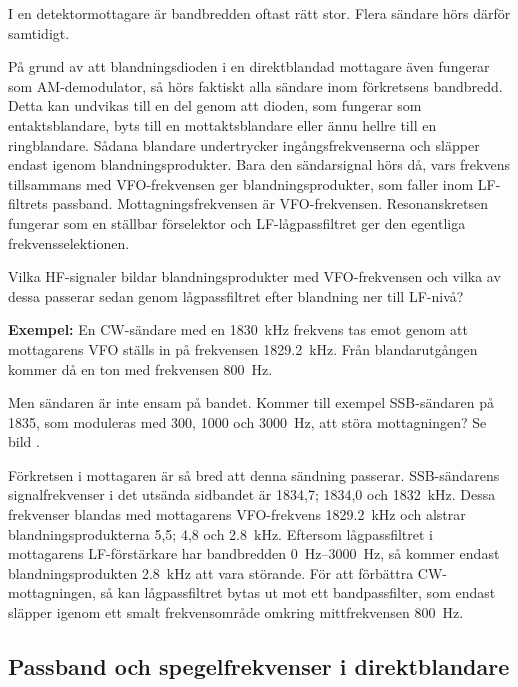 I en detektormottagare är bandbredden oftast rätt stor.
Flera sändare hörs därför samtidigt.

På grund av att blandningsdioden i en direktblandad mottagare även fungerar
som AM-demodulator, så hörs faktiskt alla sändare inom förkretsens bandbredd.
Detta kan undvikas till en del genom att dioden, som fungerar som
entaktsblandare, byts till en mottaktsblandare eller ännu hellre till en
ringblandare.
Sådana blandare undertrycker ingångsfrekvenserna och släpper endast igenom
blandningsprodukter.
Bara den sändarsignal hörs då, vars frekvens tillsammans med VFO-frekvensen
ger blandningsprodukter, som faller inom LF-filtrets passband.
Mottagningsfrekvensen är VFO-frekvensen.
Resonanskretsen fungerar som en ställbar förselektor och LF-lågpassfiltret
ger den egentliga frekvensselektionen.

Vilka HF-signaler bildar blandningsprodukter med VFO-frekvensen och
vilka av dessa passerar sedan genom lågpassfiltret efter blandning ner
till LF-nivå?

\textbf{Exempel:}
En CW-sändare med en  \SI{1830}{\kilo\hertz} frekvens tas emot genom att
mottagarens VFO ställs in på frekvensen \SI{1829,2}{\kilo\hertz}.
Från blandarutgången kommer då en ton med frekvensen \SI{800}{\hertz}.

Men sändaren är inte ensam på bandet.
Kommer till exempel SSB-sändaren på 1835, som moduleras med 300, 1000 och
\SI{3000}{\hertz}, att störa mottagningen?
Se bild .

Förkretsen i mottagaren är så bred att denna sändning passerar.
SSB-sändarens signalfrekvenser i det utsända sidbandet är 1834,7; 1834,0 och
\SI{1832}{\kilo\hertz}.
Dessa frekvenser blandas med mottagarens VFO-frekvens \SI{1829,2}{\kilo\hertz}
och alstrar blandningsprodukterna 5,5; 4,8 och \SI{2,8}{\kilo\hertz}.
Eftersom lågpassfiltret i mottagarens LF-förstärkare har bandbredden
\SIrange{0}{3000}{\hertz}, så kommer endast blandningsprodukten
\SI{2,8}{\kilo\hertz} att vara störande.
För att förbättra CW-mottagningen, så kan lågpassfiltret bytas ut mot ett
bandpassfilter, som endast släpper igenom ett smalt frekvensområde omkring
mittfrekvensen \SI{800}{\hertz}.

\subsection{Passband och spegelfrekvenser i direktblandare}
\label{passband_spegelfrekvens}

